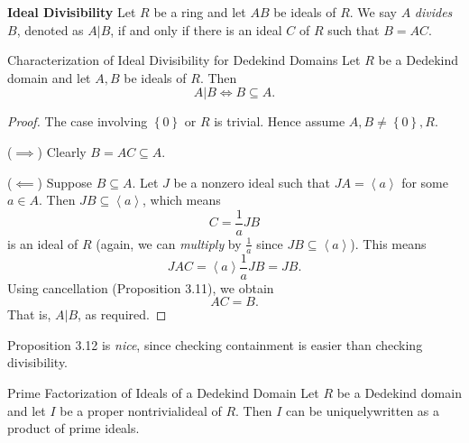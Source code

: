 \documentclass[pmath441]{subfiles}
\begin{document}
    \begin{definition}{\textbf{Ideal Divisibility}}
        Let $R$ be a ring and let $AB$ be ideals of $R$. We say $A$ \emph{divides} $B$, denoted as $A|B$, if and only if there is an ideal $C$ of $R$ such that $B= AC$.
    \end{definition}
    
    \begin{prop}{Characterization of Ideal Divisibility for Dedekind Domains}
        Let $R$ be a Dedekind domain and let $A,B$ be ideals of $R$. Then
        \begin{equation*}
            A|B \iff B\subseteq A.
        \end{equation*}
    \end{prop}

    \vspace{-\preskip}

    \begin{proof}
        The case involving $\left\lbrace 0 \right\rbrace$ or $R$ is trivial. Hence assume $A,B\neq\left\lbrace 0 \right\rbrace,R$.
        
        ($\implies$) Clearly $B=AC\subseteq A$.

        ($\impliedby$) Suppose $B\subseteq A$. Let $J$ be a nonzero ideal such that $JA = \left< a \right>$ for some $a\in A$. Then $JB \subseteq \left< a \right>$, which means
        \begin{equation*}
            C = \frac{1}{a}JB
        \end{equation*}
        is an ideal of $R$ (again, we can \textit{multiply} by $\frac{1}{a}$ since $JB\subseteq\left< a \right>$). This means
        \begin{equation*}
            JAC = \left< a \right> \frac{1}{a}JB = JB.  
        \end{equation*}
        Using cancellation (Proposition 3.11), we obtain
        \begin{equation*}
            AC = B.
        \end{equation*}
        That is, $A|B$, as required.
    \end{proof}
    
    \np Proposition 3.12 is \textit{nice}, since checking containment is easier than checking divisibility.
    
    \begin{theorem}{Prime Factorization of Ideals of a Dedekind Domain}
        Let $R$ be a Dedekind domain and let $I$ be a proper nontrivial\footnotemark[1] ideal of $R$. Then $I$ can be uniquely\footnotemark[2] written as a product of prime ideals.
        
        \noindent
        \begin{minipage}{\textwidth}
        \end{minipage}
    \end{theorem}
\end{document}
